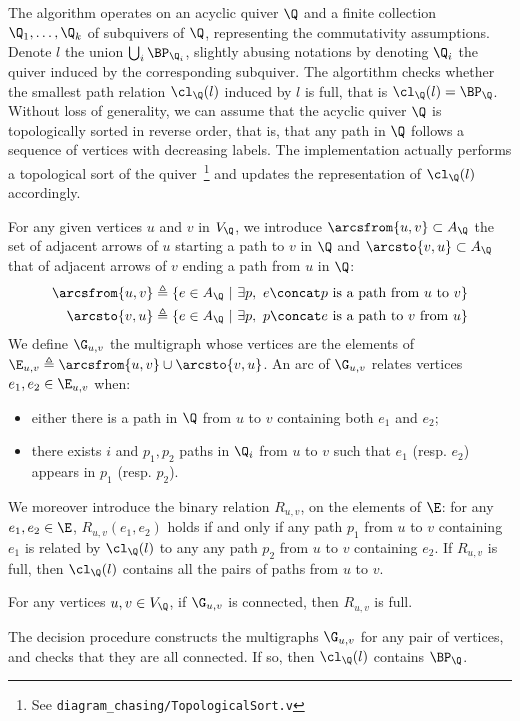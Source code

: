 \documentclass[a4paper,UKenglish,cleveref, autoref, thm-restate]{lipics-v2021}
\begin{document}
The algorithm operates on an acyclic quiver $\Q$ and a finite collection $\Q_1, \dots, \Q_k$ of subquivers of $\Q$, representing the commutativity assumptions. Denote $l$ the union $\bigcup_{i}\BP_{\Q_i}$, slightly abusing notations by denoting $\Q_i$ the quiver induced by the corresponding subquiver. The algortithm checks whether the smallest path relation $\cl_\Q(l)$ induced by $l$ is full, that is $\cl_\Q(l) = \BP_\Q$. Without loss of generality, we can assume that the acyclic quiver $\Q$ is topologically sorted in reverse order, that is, that any path in $\Q$ follows a sequence of vertices with decreasing labels. The implementation actually performs a topological sort of the quiver~\footnote{See \texttt{diagram\_chasing/TopologicalSort.v}} and updates the representation of $\cl_\Q(l)$ accordingly.

For any given vertices $u$ and $v$ in $V_\Q$, we introduce $\arcsfrom{u,v} \subset A_\Q$ the set of adjacent arrows of $u$ starting a path to $v$ in $\Q$ and $\arcsto{v,u} \subset A_\Q$ that of adjacent arrows of $v$ ending a path from $u$ in $\Q$:
\begin{align*}
\arcsfrom{u,v} & \triangleq \{ e \in A_\Q\ |\ \exists p,\ e\concat p \textrm{ is a path from } u \textrm{ to } v \} \\
\arcsto{v,u} & \triangleq \{ e \in A_\Q\ |\ \exists p,\ p\concat e \textrm{ is a path to } v \textrm{ from } u \}
\end{align*}
We define $\G_{u,v}$ the multigraph whose vertices are the elements of $\E_{u,v} \triangleq \arcsfrom{u,v} \cup \arcsto{v,u}$. An arc of $\G_{u,v}$ relates vertices $e_1, e_2 \in \E_{u,v}$ when:
\begin{itemize}
  \item either there is a path in $\Q$ from $u$ to $v$ containing both $e_1$ and $e_2$;
  \item there exists $i$ and $p_1, p_2$ paths in $\Q_i$ from $u$ to $v$ such that $e_1$ (resp. $e_2$) appears in $p_1$ (resp. $p_2$).
\end{itemize}
We moreover introduce the binary relation $R_{u,v}$, on the elements of $\E$: for any $e_1, e_2 \in \E$, $R_{u,v}(e_1, e_2)$ holds if and only if any path $p_1$ from $u$ to $v$ containing $e_1$ is related by $\cl_\Q(l)$ to any  any path $p_2$ from $u$ to $v$ containing $e_2$. If $R_{u,v}$ is full, then $\cl_\Q(l)$ contains all the pairs of paths from $u$ to $v$.
\begin{lemma}\label{lem:commerge}
  For any vertices $u,v \in V_\Q$, if\/ $\G_{u,v}$ is connected, then $R_{u,v}$ is full.
\end{lemma}
The decision procedure constructs the multigraphs $\G_{u,v}$ for any pair of vertices, and checks that they are all connected. If so, then $\cl_\Q(l)$ contains $\BP_\Q$.
\end{document}
